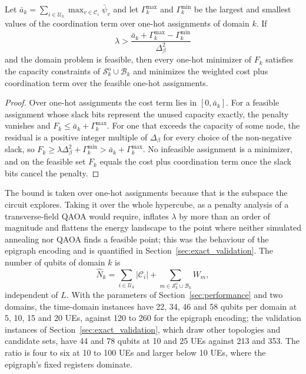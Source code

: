 \begin{proposition}
\label{prop:penalty}
Let $\bar a_k=\sum_{i\in\mathscr{U}_k}\max_{v\in\mathscr{C}_i}\bar\psi_v$ and let $\Gamma_k^{\max}$ and $\Gamma_k^{\min}$ be
the largest and smallest values of the coordination term over one-hot assignments of domain $k$. If
\begin{equation}
    \lambda>\frac{\bar a_k+\Gamma_k^{\max}-\Gamma_k^{\min}}{\Delta_\beta^{2}}
    \label{eq:lambda_sufficient}
\end{equation}
and the domain problem is feasible, then every one-hot minimizer of $F_k$ satisfies the capacity constraints of
$\mathscr{S}^{\mathrm{o}}_k\cup\mathscr{B}_k$ and minimizes the weighted cost plus coordination term over the
feasible one-hot assignments.
\end{proposition}

\begin{proof}
Over one-hot assignments the cost term lies in $[0,\bar a_k]$. For a feasible assignment whose slack bits represent
the unused capacity exactly, the penalty vanishes and $F_k\leq\bar a_k+\Gamma_k^{\max}$. For one that exceeds the
capacity of some node, the residual is a positive integer multiple of $\Delta_\beta$ for every choice of the
non-negative slack, so $F_k\geq\lambda\Delta_\beta^2+\Gamma_k^{\min}>\bar a_k+\Gamma_k^{\max}$. No infeasible
assignment is a minimizer, and on the feasible set $F_k$ equals the cost plus coordination term once the slack bits
cancel the penalty.
\end{proof}

The bound is taken over one-hot assignments because that is the subspace the circuit explores. Taking it over the
whole hypercube, as a penalty analysis of a transverse-field QAOA would require, inflates $\lambda$ by more than an
order of magnitude and flattens the energy landscape to the point where neither simulated annealing nor QAOA finds
a feasible point; this was the behaviour of the epigraph encoding and is quantified in Section~\ref{sec:exact_validation}. The number of
qubits of domain $k$ is
\begin{equation}
    \hat{N}_k=\sum_{i\in\mathscr{U}_k}|\mathscr{C}_i|+\sum_{m\in\mathscr{S}^{\mathrm{o}}_k\cup\mathscr{B}_k}W_m,
    \label{eq:Nk_compact}
\end{equation}
independent of $L$. With the parameters of Section~\ref{sec:performance} and two domains, the
time-domain instances have 22, 34, 46 and 58 qubits per domain at 5, 10, 15 and 20 UEs, against 120 to 260 for the
epigraph encoding; the validation instances of Section~\ref{sec:exact_validation}, which draw other topologies and
candidate sets, have 44 and 78 qubits at 10 and 25 UEs against 213 and 353. The ratio is four to six at 10 to 100 UEs
and larger below 10 UEs, where the epigraph's fixed registers dominate.

